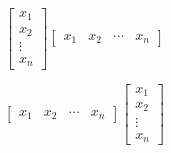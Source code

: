 \begin{exercise}
\begin{inparaenum}[a)]
\item $\begin{bmatrix} x_1 \\ x_2 \\ \vdots \\ x_n\end{bmatrix}\begin{bmatrix}x_1 & x_2 & \cdots & x_n\end{bmatrix}$ \hfill
\item $\begin{bmatrix}x_1 & x_2 & \cdots & x_n\end{bmatrix}\begin{bmatrix} x_1 \\ x_2 \\ \vdots \\ x_n\end{bmatrix}$ \hfill {} \\
\end{inparaenum}
\end{exercise}
